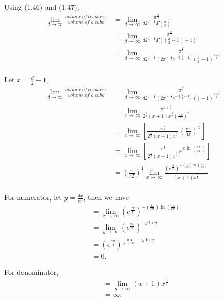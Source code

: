 \documentclass{article} %
\begin{document}
Using (1.46) and (1.47),
\begin{align*}
    \lim_{d \to \infty} \frac{volume\ of\ a\ sphere}{volume\ of\ a\ cube} &= \lim_{d \to \infty} \frac{\pi^{\frac{d}{2}}}{d2^{d-1}\Gamma(\frac{d}{2})} \\
    &= \lim_{d \to \infty} \frac{\pi^{\frac{d}{2}}}{d2^{d-1}\Gamma((\frac{d}{2}-1)+1)} \\
    &= \lim_{d \to \infty} \frac{\pi^{\frac{d}{2}}}{d2^{d-1}(2\pi)^{\frac{1}{2}}e^{-(\frac{d}{2}-1)}(\frac{d}{2}-1)^{\frac{d+1}{2}}} \\
\end{align*}

Let $x = \frac{d}{2} - 1$,
\begin{align*}
    \lim_{d \to \infty} \frac{volume\ of\ a\ sphere}{volume\ of\ a\ cube} &= \lim_{d \to \infty} \frac{\pi^{\frac{d}{2}}}{d2^{d-1}(2\pi)^{\frac{1}{2}}e^{-(\frac{d}{2}-1)}(\frac{d}{2}-1)^{\frac{d+1}{2}}} \\
    &= \lim_{x \to \infty} \frac{\pi^{x+\frac{1}{2}}}{2^{\frac{5}{2}}(x+1)x^{\frac{3}{2}}(\frac{4x}{e})^x} \\
    &= \lim_{x \to \infty} [\frac{\pi^{\frac{1}{2}}}{2^{\frac{5}{2}}(x+1)x^{\frac{3}{2}}} (\frac{e\pi}{4x})^x] \\
    &= \lim_{x \to \infty} [\frac{\pi^{\frac{1}{2}}}{2^{\frac{5}{2}}(x+1)x^{\frac{3}{2}}} e^{x \ln \left(\frac{e\pi}{4x} \right)}] \\
    &= (\frac{\pi}{32})^{\frac{1}{2}} \lim_{x \to \infty} \frac{(e^{\frac{e\pi}{4}})^{-(\frac{4x}{e\pi}) \ln \left(\frac{4x}{e\pi} \right)}}{(x+1)x^{\frac{3}{2}}} \\
\end{align*} 

For numerator, let $y = \frac{4x}{e\pi}$, then we have
\begin{align*}
    &= \lim_{x \to \infty} (e^{\frac{e\pi}{4}})^{-(\frac{4x}{e\pi}) \ln \left(\frac{4x}{e\pi} \right)}\\
    &= \lim_{y \to \infty} (e^{\frac{e\pi}{4}})^{-y \ln y}\\
    &= (e^{\frac{e\pi}{4}})^{\lim_{y \to \infty} -y \ln y} \\
    &= 0.
\end{align*} 

For denominator,
\begin{align*}
    &= \lim_{d \to \infty} (x+1)x^{\frac{3}{2}}\\
    &= \infty. \\
\end{align*} 
\end{document}
